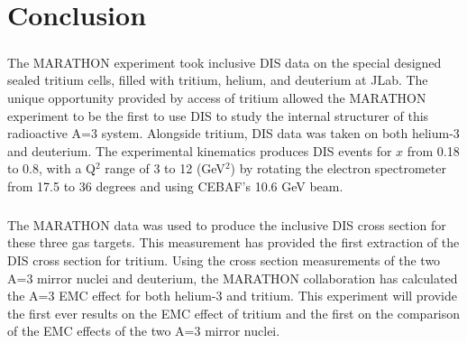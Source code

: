 
\chapter{Conclusion}
\paragraph{}The MARATHON experiment took inclusive DIS data on the special designed sealed tritium cells, filled with tritium, helium, and deuterium at JLab. The unique opportunity provided by access of tritium allowed the MARATHON experiment to be the first to use DIS to study the internal structurer of this radioactive A=3 system. Alongside tritium, DIS data was taken on both helium-3 and deuterium. The experimental kinematics produces DIS events for $x$ from 0.18 to 0.8, with a Q$^2$ range of 3 to 12 (GeV$^2$) by rotating the electron spectrometer from 17.5 to 36 degrees and using CEBAF's 10.6 GeV beam. 
\paragraph{}The MARATHON data was used to produce the inclusive DIS cross section for these three gas targets. This measurement has provided the first extraction of the DIS cross section for tritium. Using the cross section measurements of the two A=3 mirror nuclei and deuterium, the MARATHON collaboration has calculated the A=3 EMC effect for both helium-3 and tritium. This experiment will provide the first ever results on the EMC effect of tritium and the first  on the comparison of the EMC effects of the two A=3 mirror nuclei.
\paragraph{}